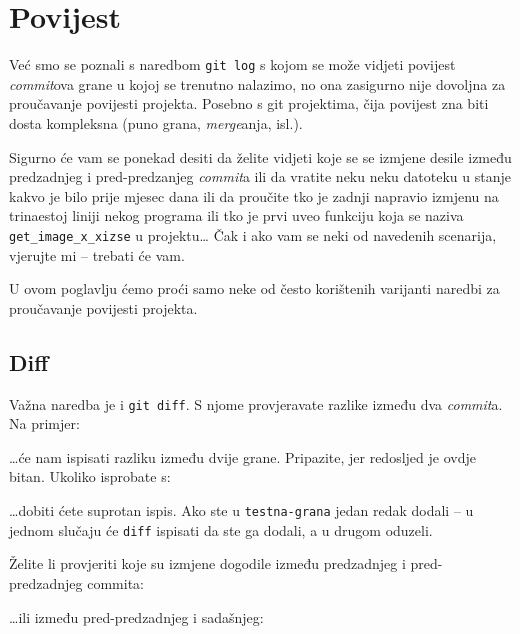 \chapter*{Povijest}

Već smo se poznali s naredbom \verb+git log+ s kojom se može vidjeti povijest \emph{commit}ova grane u kojoj se trenutno nalazimo, no ona zasigurno nije dovoljna za proučavanje povijesti projekta.
Posebno s git projektima, čija povijest zna biti dosta kompleksna (puno grana, \emph{merge}anja, isl.).

Sigurno će vam se ponekad desiti da želite vidjeti koje se se izmjene desile između predzadnjeg i pred-predzanjeg \emph{commit}a ili da vratite neku neku datoteku u stanje kakvo je bilo prije mjesec dana ili da proučite tko je zadnji napravio izmjenu na trinaestoj liniji nekog programa ili tko je prvi uveo funkciju koja se naziva \verb+get_image_x_xizse+ u projektu\dots 
Čak i ako vam se neki od navedenih scenarija, vjerujte mi -- trebati će vam.

U ovom poglavlju ćemo proći samo neke od često korištenih varijanti naredbi za proučavanje povijesti projekta.

\section*{Diff}

Važna naredba je i \verb+git diff+. 
S njome provjeravate razlike između dva \emph{commit}a.
Na primjer:


\dots{}će nam ispisati razliku između dvije grane. Pripazite, jer redosljed je ovdje bitan.
Ukoliko isprobate s:


\dots{}dobiti ćete suprotan ispis. 
Ako ste u \verb+testna-grana+ jedan redak dodali -- u jednom slučaju će \verb+diff+ ispisati da ste ga dodali, a u drugom oduzeli.

Želite li provjeriti koje su izmjene dogodile između predzadnjeg i pred-predzadnjeg commita:


\dots{}ili između pred-predzadnjeg i sadašnjeg:


